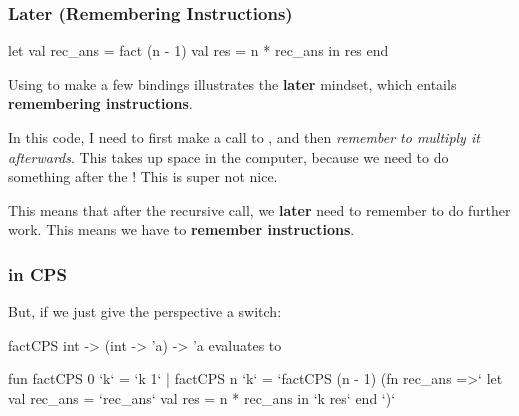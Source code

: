 \documentclass[aspectratio=169]{beamer}
\begin{document}
\begin{frame}[fragile]
  \frametitle{Later (Remembering Instructions)}

  \begin{codeblock}
    let
      val rec_ans = fact (n - 1)
      val res = n * rec_ans
    in
      res
    end
  \end{codeblock}

  Using  to make a few bindings illustrates the \textbf{later} mindset,
  which entails \textbf{remembering instructions}.

  \pause
  \vspace{\fill}

  In this code, I need to first make a call to , and then
  \textit{remember to multiply it afterwards}. This takes up space in the computer,
  because we need to do something after the ! This is super not nice.

  \pause
  \vspace{\fill}

  This means that after the recursive call, we \textbf{later} need to remember to
  do further work. This means we have to \textbf{remember instructions}.
\end{frame}

\begin{frame}[fragile]
  \frametitle{ in CPS}

  But, if we just give the perspective a switch:

  \pause
  \vspace{\fill}

  \spec
    {factCPS}
    {int -> (int -> 'a) -> 'a}
    {}
    { evaluates to }

  \pause
  \vspace{\fill}

  {\small
  \begin{codeblock}
    fun factCPS 0 `k` = `k 1`
      | factCPS n `k` =
        `factCPS (n - 1) (fn rec_ans =>`
          let
            val rec_ans = `rec_ans`
            val res = n * rec_ans
          in
            `k res`
          end
        `)`
  \end{codeblock}
  }
\end{frame}
\end{document}

